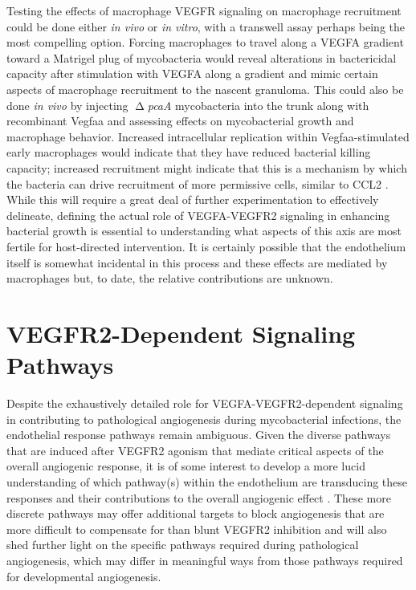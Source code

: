 Testing the effects of macrophage VEGFR signaling on macrophage recruitment could be done either \textit{in vivo} or \textit{in vitro}, with a transwell assay perhaps being the most compelling option. Forcing macrophages to travel along a VEGFA gradient toward a Matrigel plug of mycobacteria would reveal alterations in bactericidal capacity after stimulation with VEGFA along a gradient and mimic certain aspects of macrophage recruitment to the nascent granuloma. This could also be done \textit{in vivo} by injecting $\upDelta$\textit{pcaA} mycobacteria into the trunk along with recombinant Vegfaa and assessing effects on mycobacterial growth and macrophage behavior. Increased intracellular replication within Vegfaa\hyp{}stimulated early macrophages would indicate that they have reduced bacterial killing capacity; increased recruitment might indicate that this is a mechanism by which the bacteria can drive recruitment of more permissive cells, similar to CCL2 \citep{Cambier2014b}. While this will require a great deal of further experimentation to effectively delineate, defining the actual role of VEGFA\hyp{}VEGFR2 signaling in enhancing bacterial growth is essential to understanding what aspects of this axis are most fertile for host\hyp{}directed intervention. It is certainly possible that the endothelium itself is somewhat incidental in this process and these effects are mediated by macrophages but, to date, the relative contributions are unknown. 

\section{VEGFR2\hyp{}Dependent Signaling Pathways}

Despite the exhaustively detailed role for VEGFA\hyp{}VEGFR2\hyp{}dependent signaling in contributing to pathological angiogenesis during mycobacterial infections, the endothelial response pathways remain ambiguous. Given the diverse pathways that are induced after VEGFR2 agonism that mediate critical aspects of the overall angiogenic response, it is of some interest to develop a more lucid understanding of which pathway(s) within the endothelium are transducing these responses and their contributions to the overall angiogenic effect \citep{Abhinand2016}. These more discrete pathways may offer additional targets to block angiogenesis that are more difficult to compensate for than blunt VEGFR2 inhibition and will also shed further light on the specific pathways required during pathological angiogenesis, which may differ in meaningful ways from those pathways required for developmental angiogenesis.

